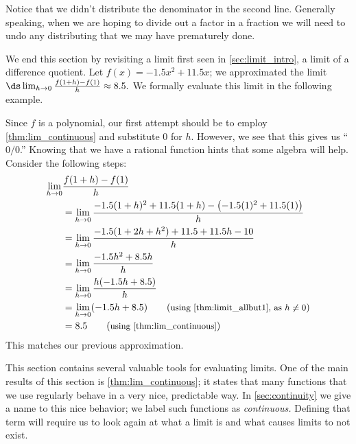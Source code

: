 Notice that we didn't distribute the denominator in the second line.  Generally speaking, when we are hoping to divide out a factor in a fraction we will need to undo any distributing that we may have prematurely done.\bigskip

We end this section by revisiting a limit first seen in \autoref{sec:limit_intro}, a limit of a difference quotient. Let $f(x) = -1.5x^2+11.5x$; we approximated the limit $\ds \lim_{h\to 0}\frac{f(1+h)-f(1)}{h}\approx 8.5.$ We formally evaluate this limit in the following example.

{Since $f$ is a polynomial, our first attempt should be to employ \autoref{thm:lim_continuous} and substitute 0 for $h$. However, we see that this gives us ``$0/0$.'' %
Knowing that we have a rational function hints that some algebra will help. Consider the following steps:
\begin{align*}
	\lim_{h\to 0} & \frac{f(1+h)-f(1)}{h} \\
	&= \lim_{h\to 0}\frac{-1.5(1+h)^2 + 11.5(1+h) - \left(-1.5(1)^2+11.5(1)\right)}{h} \\
	&= \lim_{h\to 0}\frac{-1.5(1+2h+h^2) + 11.5+11.5h - 10}{h}\\
	&= \lim_{h\to 0}\frac{-1.5h^2 +8.5h}{h}\\
	&= \lim_{h\to 0}\frac{h(-1.5h+8.5)}h\\
	&= \lim_{h\to 0}(-1.5h+8.5) \qquad (\text{\small using \autoref{thm:limit_allbut1}, as $h\neq 0$}) \\
	&= 	8.5 \qquad (\text{\small using \autoref{thm:lim_continuous}})
\end{align*}	
This matches our previous approximation.}

This section contains several valuable tools for evaluating limits. One of the main results of this section is \autoref{thm:lim_continuous}; it states that many functions that we use regularly behave in a very nice, predictable way. In \autoref{sec:continuity} we give a name to this nice behavior; we label such functions as \textit{continuous.} Defining that term will require us to look again at what a limit is and what causes limits to not exist.

